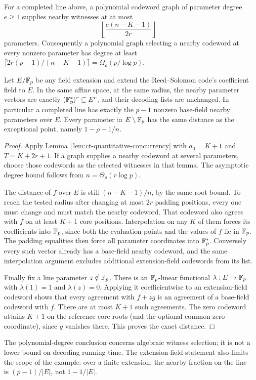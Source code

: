 


\begin{corollary}
\label{pd:witness-extension}
For a completed line above, a polynomial codeword graph of parameter
 degree $e\ge1$ supplies nearby witnesses at at most
\[
 \left\lfloor\frac{e(n-K-1)}{2r}\right\rfloor
\]
parameters. Consequently a polynomial graph selecting a nearby codeword
at every nonzero parameter has degree at least
$\lceil 2r(p-1)/(n-K-1)\rceil=\Omega_\rho(p/\log p)$.

Let $E/\mathbb F_p$ be any field extension and extend the Reed--Solomon code's
coefficient field to $E$. In the same affine space, at the same radius,
the nearby parameter vectors are exactly $(\mathbb F_p^*)^r\subseteq E^r$,
and their decoding lists are unchanged. In particular a completed line
has exactly the $p-1$ nonzero base-field nearby parameters over $E$.
Every parameter in $E\setminus\mathbb F_p$ has the same distance as the
exceptional point, namely $1-\rho-1/n$.
\end{corollary}
\begin{proof}
Apply Lemma~\ref{lem:ct-quantitative-concurrency} with $a_0=K+1$ and
$T=K+2r+1$. If a graph supplies a nearby codeword at several parameters,
choose those codewords as the selected witnesses in that lemma. The
asymptotic degree bound follows from $n=\Theta_\rho(r\log p)$.

The distance of $f$ over $E$ is still $(n-K-1)/n$, by the same root
bound. To reach the tested radius after changing at most $2r$ padding
positions, every one must change and must match the nearby codeword.
That codeword also agrees with $f$ on at least $K+1$ core positions.
Interpolation on any $K$ of them forces its coefficients into $\mathbb F_p$,
since both the evaluation points and the values of $f$ lie in $\mathbb F_p$.
The padding equalities then force all parameter coordinates into
$\mathbb F_p^*$. Conversely every such vector already has a base-field nearby
codeword, and the same interpolation argument excludes additional
extension-field codewords from its list.

Finally fix a line parameter $z\notin\mathbb F_p$. There is an
$\mathbb F_p$-linear functional $\lambda:E\to\mathbb F_p$ with
$\lambda(1)=1$ and $\lambda(z)=0$. Applying it coefficientwise
to an extension-field codeword shows that every agreement with
$f+zg$ is an agreement of a base-field codeword with $f$. There are
at most $K+1$ such agreements. The zero codeword attains $K+1$ on
the reference core roots (and the optional common zero coordinate),
since $g$ vanishes there. This proves the exact distance.
\end{proof}

The polynomial-degree conclusion concerns algebraic witness selection;
it is not a lower bound on decoding running time. The extension-field
statement also limits the scope of the example: over a finite extension,
the nearby fraction on the line is $(p-1)/|E|$, not $1-1/|E|$.
